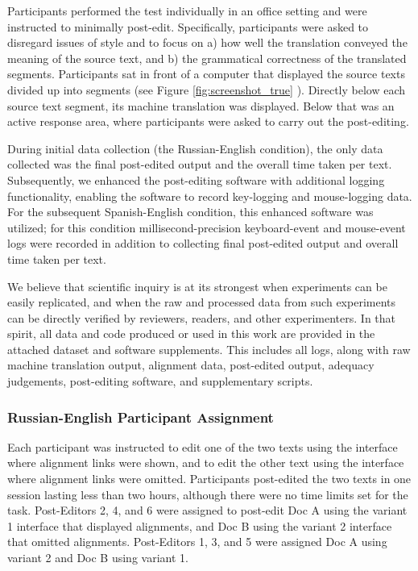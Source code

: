 Participants performed the test individually in an office setting and were instructed to minimally post-edit. 
%
Specifically, participants were asked to disregard issues of style and to focus on 
%
a) how well the translation conveyed the meaning of the source text, and 
%
b) the grammatical correctness of the translated segments. 
%
Participants sat in front of a computer that displayed the source texts divided up into segments (see Figure \ref{fig:screenshot_true} ). %
%
Directly below each source text segment, its machine translation was displayed.
%
Below that was an active response area, where participants were asked to carry out the post-editing.

During initial data collection (the Russian-English condition), the only data collected was the final post-edited output and the overall time taken per text.
%
Subsequently, we enhanced the post-editing software with additional logging functionality, enabling the software to record key-logging and mouse-logging data.
%
For the subsequent Spanish-English condition, this enhanced software was utilized; for this condition millisecond-precision keyboard-event and mouse-event logs were recorded in addition to collecting final post-edited output and overall time taken per text.

We believe that scientific inquiry is at its strongest when experiments can be easily replicated, and when the raw and processed data from such experiments can be directly verified by reviewers, readers, and other experimenters.
%
In that spirit, all data and code produced or used in this work are provided in the attached dataset and software supplements.
%
This includes all logs, along with raw machine translation output, alignment data, post-edited output, adequacy judgements, post-editing software, and supplementary scripts.



\subsubsection{Russian-English Participant Assignment}




Each participant was instructed to edit one of the two texts using the interface where alignment links were shown,
%
and to edit the other text using the interface where alignment links were omitted.
%
Participants post-edited the two texts in one session lasting less than two hours, although there were no time limits set for the task.
%
Post-Editors 2, 4, and 6 were assigned to post-edit Doc A using the variant 1 interface that displayed alignments, and Doc B using the variant 2 interface that omitted alignments.
%
Post-Editors 1, 3, and 5 were assigned Doc A using variant 2 and Doc B using variant 1.

